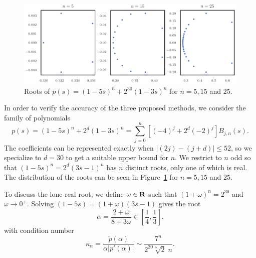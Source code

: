 \begin{figure}
  \includegraphics{../images/compensated-newton/root_plots.pdf}
  \centering
  \captionsetup{width=.75\linewidth}
  \caption{Roots of \(p(s) = (1 - 5s)^n + 2^{30} (1 - 3s)^n\) for
    \(n = 5, 15\) and \(25\).}
  \label{fig:root-plots}
\end{figure}

In order to verify the accuracy of the three proposed methods, we
consider the family of polynomials
\begin{equation}
p(s) = (1 - 5s)^n + 2^{d} (1 - 3s)^n = \sum_{j = 0}^n \left[(-4)^j +
  2^{d} (-2)^j\right] B_{j, n}(s).
\end{equation}
The coefficients can be represented exactly when \(\left|(2j) -
(j + d)\right| \leq 52\), so we specialize to \(d = 30\) to get a
suitable upper bound for \(n\). We restrict to \(n\) odd so that
\((1 - 5s)^n = 2^{d} (3s - 1)^n\) has \(n\) distinct roots, only one of
which is real. The distribution of the roots can be seen in
Figure~\ref{fig:root-plots} for \(n = 5, 15\) and \(25\).

To discuss the lone real root, we define \(\omega \in \mathbf{R}\) such that
\((1 + \omega)^n = 2^{30}\) and \(\omega \to 0^+\). Solving
\((1 - 5s) = (1 + \omega)(3s - 1)\) gives the root
\begin{equation}
\alpha = \frac{2 + \omega}{8 + 3 \omega} \in \left[\frac{1}{4},
  \frac{1}{3}\right].
\end{equation}
with condition number
\begin{equation}
\kappa_{\alpha} = \frac{\widetilde{p}(\alpha)}{\alpha \left|p'(\alpha)\right|}
  \sim \frac{7^n}{2^{20} \sqrt[7]{2} \; n}.
\end{equation}

